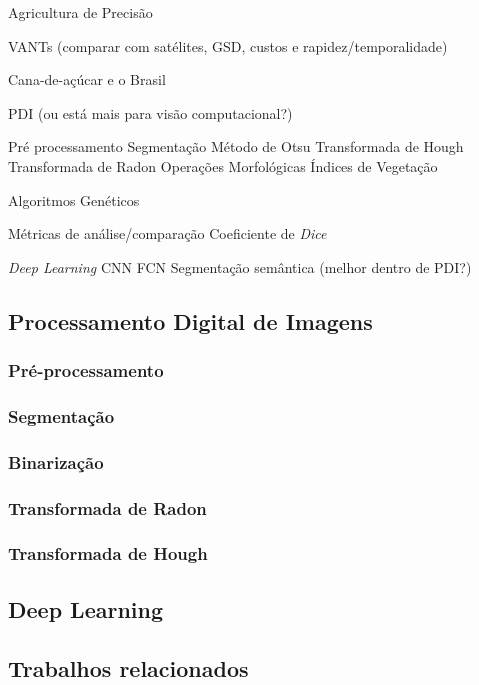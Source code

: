 \documentclass[12pt, a4paper, english, brazil]{article}
\newcommand{\textBlue}[1]{{{\color{blue} #1}}}
\begin{document}
\textBlue{
Agricultura de Precisão

VANTs (comparar com satélites, GSD, custos e rapidez/temporalidade)

Cana-de-açúcar e o Brasil

PDI (ou está mais para visão computacional?)

    Pré processamento
    Segmentação
    Método de Otsu
    Transformada de Hough
    Transformada de Radon
    Operações Morfológicas
    Índices de Vegetação

Algoritmos Genéticos

Métricas de análise/comparação
    Coeficiente de \textit{Dice}

\textit{Deep Learning}
    CNN
    FCN
    Segmentação semântica (melhor dentro de PDI?)
}

\subsection{Processamento Digital de Imagens}

\subsubsection{Pré-processamento}

\subsubsection{Segmentação}

\subsubsection{Binarização}

\subsubsection{Transformada de Radon}

\subsubsection{Transformada de Hough}

\subsection{Deep Learning}

\subsection{Trabalhos relacionados}
\end{document}
